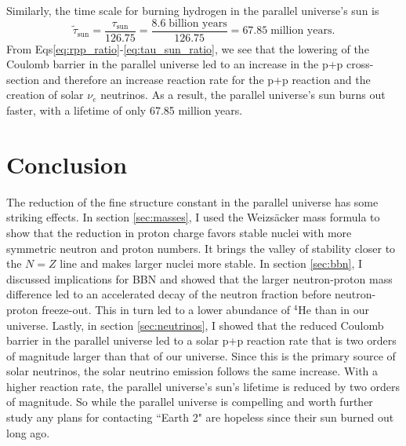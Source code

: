 \documentclass[%
 reprint,
 amsmath,amssymb,
 aps,
]{revtex4-1}
\begin{document}
Similarly, the time scale for burning hydrogen in the parallel universe's sun is\cite{HaxtonLectureNotes}
\begin{equation}
    \widetilde{\tau}_\text{sun} = \frac{\tau_\text{sun}}{126.75}
    = \frac{8.6 \; \text{billion years}}{126.75}
    = 67.85 \; \text{million years}.
    \label{eq:tau_sun_ratio}
\end{equation}
From Eqs\eqref{eq:rpp_ratio}-\eqref{eq:tau_sun_ratio}, we see that the lowering of the Coulomb barrier in the parallel universe led to an increase in the p+p cross-section and therefore an increase reaction rate for the p+p reaction and the creation of solar $\nu_e$ neutrinos. As a result, the parallel universe's sun burns out faster, with a lifetime of only 67.85 million years.

\section{\label{sec:conclusion}Conclusion}

The reduction of the fine structure constant in the parallel universe has some striking effects. In section \ref{sec:masses}, I used the Weizs\"acker mass formula to show that the reduction in proton charge favors stable nuclei with more symmetric neutron and proton numbers. It brings the valley of stability closer to the $N = Z$ line and makes larger nuclei more stable. In section \ref{sec:bbn}, I discussed implications for BBN and showed that the larger neutron-proton mass difference led to an accelerated decay of the neutron fraction before neutron-proton freeze-out. This in turn led to a lower abundance of ${}^4\text{He}$ than in our universe. Lastly, in section \ref{sec:neutrinos}, I showed that the reduced Coulomb barrier in the parallel universe led to a solar p+p reaction rate that is two orders of magnitude larger than that of our universe. Since this is the primary source of solar neutrinos, the solar neutrino emission follows the same increase. With a higher reaction rate, the parallel universe's sun's lifetime is reduced by two orders of magnitude. So while the parallel universe is compelling and worth further study any plans for contacting ``Earth 2" are hopeless since their sun burned out long ago.


 
\end{document}
